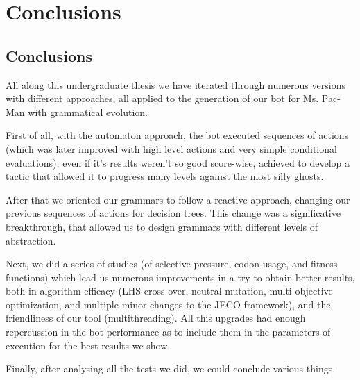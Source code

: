 \chapter{Conclusions}

\section{Conclusions}
All along this undergraduate thesis we have iterated through numerous versions with different approaches, all applied to the generation of our bot for Ms. Pac-Man with grammatical evolution.
 
First of all, with the automaton approach, the bot executed sequences of actions (which was later improved with high level actions and very simple conditional evaluations), even if it’s results weren’t so good score-wise, achieved to develop a tactic that allowed it to progress many levels against the most silly ghosts.
 
After that we oriented our grammars to follow a reactive approach, changing our previous sequences of actions for decision trees. This change was a significative breakthrough, that allowed us to design grammars with different levels of abstraction.
 
Next, we did a series of studies (of selective pressure, codon usage, and fitness functions) which lead us numerous improvements in a try to obtain better results, both in algorithm efficacy (LHS cross-over, neutral mutation, multi-objective optimization, and multiple minor changes to the JECO framework), and the friendliness of our tool (multithreading). All this upgrades had enough repercussion in the bot performance as to include them in the parameters of execution for the best results we show.
 
Finally, after analysing all the tests we did, we could conclude various things.
 
